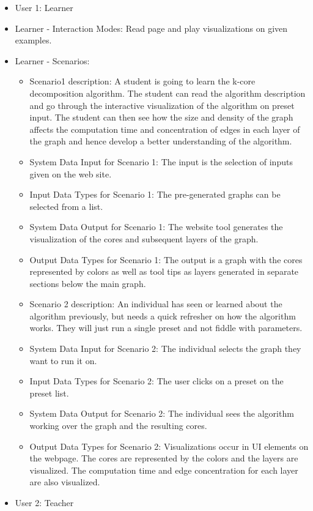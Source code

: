 \begin{itemize}
\item{User 1: } Learner
\item{Learner - Interaction Modes: }
Read page and play visualizations on given examples.
\item{Learner - Scenarios: }
	\begin{itemize} 
	\item{Scenario1 description: }
	A student is going to learn the k-core decomposition algorithm. The student can read the algorithm description and go through the interactive visualization of the algorithm on preset input. The student can then see how the size and density of the graph affects the computation time and concentration of edges in each layer of the graph and hence develop a better understanding of the algorithm.
	\item{System Data Input for Scenario 1: }
	The input is the selection of inputs given on the web site. 
    \item{Input Data Types for Scenario 1:}
    The pre-generated graphs can be selected from a list.
	\item{System Data Output for Scenario 1: }
	The website tool generates the visualization of the cores and subsequent layers of the graph.
    \item {Output Data Types for Scenario 1: }
    The output is a graph with the cores represented by colors as well as tool tips as layers generated in separate sections below the main graph.
    \item{Scenario 2 description:}
	An individual has seen or learned about the algorithm previously, but needs a quick refresher on how the algorithm works. They will just run a single preset and not fiddle with parameters.
	\item{System Data Input for Scenario 2: }
	The individual selects the graph they want to run it on.
    \item{Input Data Types for Scenario 2:}
    The user clicks on a preset on the preset list.
	\item{System Data Output for Scenario 2: }
    The individual sees the algorithm working over the graph and the resulting cores.
    \item {Output Data Types for Scenario 2: }
    Visualizations occur in UI elements on the webpage. The cores are represented by the colors and the layers are visualized. The computation time and edge concentration for each layer are also visualized.
	\end{itemize}
\item{User 2: } Teacher

\end{itemize}
